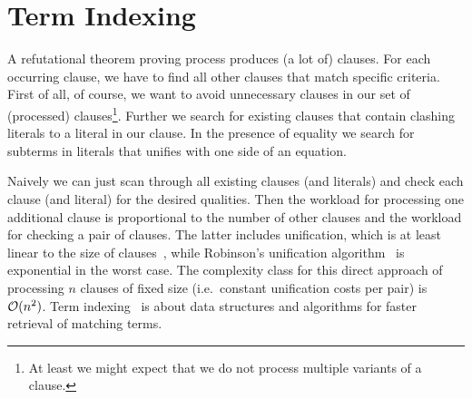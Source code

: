 











\section{Term Indexing}








A refutational theorem proving process produces (a lot of) clauses.
For each occurring clause, we have to find
all other clauses that match specific criteria.
First of all, of course, we want to avoid unnecessary clauses in our set of (processed) clauses\footnote{
	At least we might expect that we do not process multiple variants of a clause.
}.
Further we search for existing clauses that contain clashing literals to a literal in our clause.
In the presence of equality we search for subterms in literals that unifies with one side of an equation.

Naively we can just scan through all existing clauses (and literals)
and check each clause (and literal) for the desired qualities.
	Then the workload for processing one additional clause is proportional to the number of other clauses and
	the workload for checking a pair of clauses.
	The latter includes unification, which is at least linear to the size of clauses~\cite{ALBERT19933},
	while Robinson's unification algorithm~\cite{Robinson:1965:MLB:321250.321253} is exponential in the worst case.
	The complexity class for this direct approach of processing \( n \) clauses of fixed size (i.e.\ constant unification costs per pair) is \( \mathcal{O}(n^2) \).
%
	Term indexing~\cite{Graf1998} is about data structures and algorithms
	for faster retrieval of matching terms.

